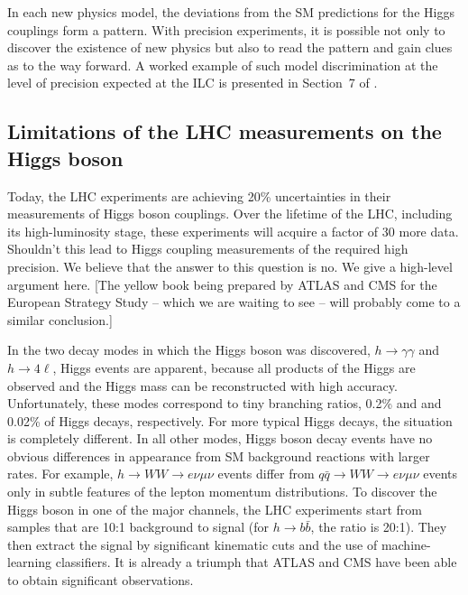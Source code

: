 In each new physics model, the  deviations from the SM predictions for the Higgs couplings form a pattern.  With precision experiments, it is possible not only to discover the existence of new physics but also to read the pattern and gain clues as to the way forward.   A worked example of such model discrimination at the level of precision expected at the ILC  is presented in
Section~7 of  \cite{Barklow:2017suo}.


\subsection{Limitations of the LHC measurements on the Higgs boson}

Today, the LHC experiments are achieving 20\% uncertainties in their measurements of Higgs boson couplings.   Over the lifetime of the LHC, including its high-luminosity stage, these experiments will acquire a factor of 30 more data.   Shouldn't this lead to Higgs coupling measurements of the required high precision.  We believe that the answer to this question is no.   We give a high-level argument here.  [The yellow book  being prepared by ATLAS and CMS for the European Strategy Study -- which we are waiting to see -- will probably come to a similar conclusion.]

In the two decay modes in which the Higgs boson was discovered, $h\to \gamma\gamma$ and $h\to 4\ell$, Higgs events are apparent, because all products of the Higgs are observed and the Higgs mass can be reconstructed with high accuracy.  Unfortunately, these modes correspond to tiny branching ratios,  0.2\% and and 0.02\% of Higgs decays, respectively.  For more typical Higgs decays, the situation is completely different.  In all other modes, Higgs boson decay events have no obvious differences in appearance from SM background reactions with larger rates.   For example, $h\to WW\to e\nu \mu \nu $ events differ from $q\bar q\to WW \to  e\nu \mu \nu $ events only in subtle features of the lepton momentum distributions.  To discover the Higgs boson in one of the major channels, the LHC experiments start from samples that are 10:1 background to signal (for $h\to b\bar b$, the ratio is 20:1). They then  extract the signal by significant kinematic cuts and the use of machine-learning classifiers.  It is already a triumph that ATLAS and CMS have been able to obtain significant observations. 

